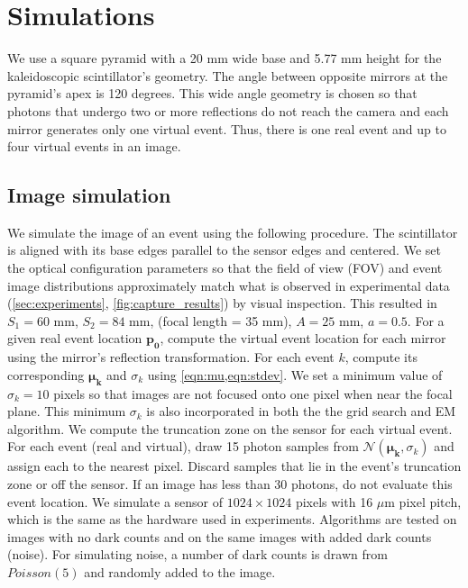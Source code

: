 \section{Simulations}

We use a square pyramid with a 20 mm wide base and 5.77 mm height for the 
kaleidoscopic scintillator's geometry.
The angle between opposite mirrors at the pyramid's apex is 120 degrees.
This wide angle geometry is chosen so that photons that undergo two or more 
reflections do not reach the camera and each mirror generates only one virtual event.
Thus, there is one real event and up to four virtual events in an image.

\subsection{Image simulation} \label{sec:image_sim}

We simulate the image of an event using the following procedure.
The scintillator is aligned with its base edges parallel to the sensor edges and centered.
We set the optical configuration parameters so that the field of view (FOV) and 
event image distributions approximately match what is observed in experimental 
data (\cref{sec:experiments}, \cref{fig:capture_results}) by visual inspection. 
This resulted in $S_1=60$ mm, $S_2=84$ mm, (focal length = 35 mm), $A=25$ mm, $a=0.5$.
For a given real event location $\bm{p_0}$, compute the virtual event location 
for each mirror using the mirror's reflection transformation.
For each event $k$, compute its corresponding $\bm{\mu_k}$ and $\sigma_k$ using \cref{eqn:mu,eqn:stdev}.
We set a minimum value of $\sigma_k=10$ pixels so that images are not focused 
onto one pixel when near the focal plane.
This minimum $\sigma_k$ is also incorporated in both the the grid search and EM algorithm.
We compute the truncation zone on the sensor for each virtual event.
For each event (real and virtual), draw 15 photon samples from $\mathcal{N}(\bm{\mu_k},\sigma_k)$ and assign each to the nearest pixel.
Discard samples that lie in the event's truncation zone or off the sensor.
If an image has less than 30 photons, do not evaluate this event location.
We simulate a sensor of $1024 \times 1024$ pixels with 16 $\mu$m pixel pitch, 
which is the same as the hardware used in experiments.
Algorithms are tested on images with no dark counts and on the same images with 
added dark counts (noise).
For simulating noise, a number of dark counts is drawn from $Poisson(5)$ and 
randomly added to the image.


